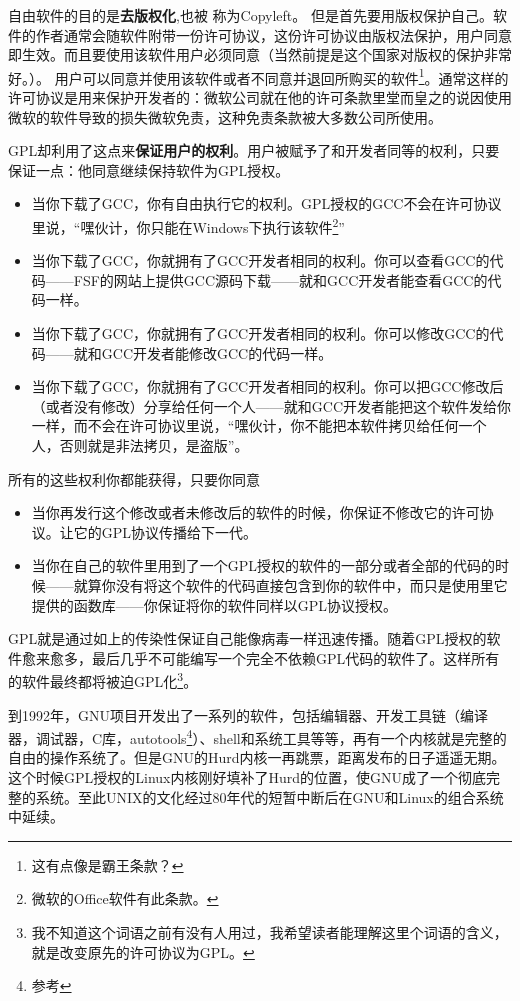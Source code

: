 自由软件的目的是\textbf{去版权化},也被 称为Copyleft。
但是首先要用版权保护自己。软件的作者通常会随软件附带一份许可协议，这份许可协议由版权法保护，用户同意即生效。而且要使用该软件用户必须同意（当然前提是这个国家对版权的保护非常好。）。
用户可以同意并使用该软件或者不同意并退回所购买的软件\footnote{这有点像是霸王条款？}。通常这样的许可协议是用来保护开发者的：微软公司就在他的许可条款里堂而皇之的说因使用微软的软件导致的损失微软免责，这种免责条款被大多数公司所使用。

GPL却利用了这点来\textbf{保证用户的权利}。用户被赋予了和开发者同等的权利，只要保证一点：他同意继续保持软件为GPL授权。

\begin{itemize}
\item 当你下载了GCC，你有自由执行它的权利。GPL授权的GCC不会在许可协议里说，“嘿伙计，你只能在Windows下执行该软件\footnote{微软的Office软件有此条款。}”

\item 当你下载了GCC，你就拥有了GCC开发者相同的权利。你可以查看GCC的代码------FSF的网站上提供GCC源码下载------就和GCC开发者能查看GCC的代码一样。

\item  当你下载了GCC，你就拥有了GCC开发者相同的权利。你可以修改GCC的代码------就和GCC开发者能修改GCC的代码一样。

\item  当你下载了GCC，你就拥有了GCC开发者相同的权利。你可以把GCC修改后（或者没有修改）分享给任何一个人------就和GCC开发者能把这个软件发给你一样，而不会在许可协议里说，“嘿伙计，你不能把本软件拷贝给任何一个人，否则就是非法拷贝，是盗版”。

\end{itemize}

所有的这些权利你都能获得，只要你同意
\begin{itemize}
\item 当你再发行这个修改或者未修改后的软件的时候，你保证不修改它的许可协议。让它的GPL协议传播给下一代。
\item 当你在自己的软件里用到了一个GPL授权的软件的一部分或者全部的代码的时候------就算你没有将这个软件的代码直接包含到你的软件中，而只是使用里它提供的函数库------你保证将你的软件同样以GPL协议授权。
\end{itemize}

GPL就是通过如上的传染性保证自己能像病毒一样迅速传播。随着GPL授权的软件愈来愈多，最后几乎不可能编写一个完全不依赖GPL代码的软件了。这样所有的软件最终都将被迫GPL化\footnote{我不知道这个词语之前有没有人用过，我希望读者能理解这里个词语的含义，就是改变原先的许可协议为GPL。}。

到1992年，GNU项目开发出了一系列的软件，包括编辑器、开发工具链（编译器，调试器，C库，autotools\footnote{参考}）、shell和系统工具等等，再有一个内核就是完整的自由的操作系统了。但是GNU的Hurd内核一再跳票，距离发布的日子遥遥无期。这个时候GPL授权的Linux内核刚好填补了Hurd的位置，使GNU成了一个彻底完整的系统。至此UNIX的文化经过80年代的短暂中断后在GNU和Linux的组合系统中延续。
